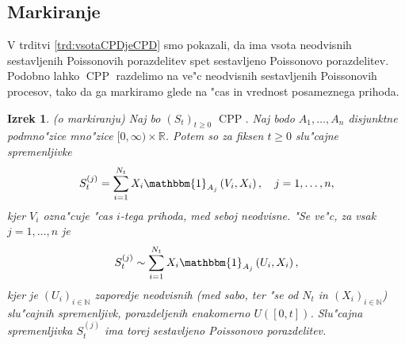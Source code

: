 \documentclass[12pt, a4paper, reqno]{amsart}
\theoremstyle{definition}
\theoremstyle{plain}
\newtheorem{izrek}[definicija]{Izrek}
\newcommand{\R}{\mathbb{R}}
\newcommand{\N}{\mathbb{N}}
\newcommand{\1}{\mathds{1}}
\DeclareMathOperator{\CPP}{CPP}
\begin{document}
%
%
%
%            

    \subsection{Markiranje}
        V trditvi \ref{trd:vsotaCPDjeCPD} smo pokazali, da ima vsota neodvisnih sestavljenih Poissonovih porazdelitev 
        spet sestavljeno Poissonovo porazdelitev. Podobno lahko $\CPP$ razdelimo na ve"c neodvisnih
        sestavljenih Poissonovih procesov, tako da ga markiramo glede na "cas in vrednost posameznega 
        prihoda. 
 
        \begin{izrek}(o markiranju)
            Naj bo $(S_t)_{t\geq0}$ $\CPP$. Naj bodo $A_1, \dots, A_n$ disjunktne podmno"zice mno"zice 
            $[0, \infty) \times \R$. Potem so za fiksen $t\geq0$ slu"cajne spremenljivke
            \begin{equation}
                S_t^{(j)} = \sum_{i=1}^{N_t}X_i\mathbbm{1}_{A_j}\left(V_i, X_i\right), \quad j = 1, \dots, n,
                \label{eq:markedCPP}
            \end{equation}
            kjer $V_i$ ozna"cuje "cas $i$-tega prihoda, med seboj neodvisne. "Se ve"c, za vsak $j = 1, \dots, n$ je
            \begin{equation*}
                S_t^{(j)} \sim \sum_{i=1}^{N_t}X_i\mathbbm{1}_{A_j}\left(U_i, X_i\right),
            \end{equation*}
            kjer je $(U_i)_{i\in\N}$ zaporedje neodvisnih (med sabo, ter "se od $N_t$ in $(X_i)_{i\in\N}$) 
            slu"cajnih spremenljivk, porazdeljenih enakomerno $U\left([0, t]\right)$. Slu"cajna spremenljivka 
            $S_t^{(j)}$ ima torej sestavljeno Poissonovo porazdelitev.
            \label{izr:MarkiranjeCPP}
        \end{izrek}
\end{document}
